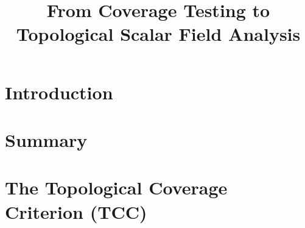 \documentclass[12pt]{article}
\begin{document}
\title{From Coverage Testing to Topological Scalar Field Analysis}
\maketitle



\section{Introduction}\label{sec:introduction}
  
  

%     
%     
%     
%     
%     


\section{Summary}\label{sec:summary}


\section{The Topological Coverage Criterion (TCC)}\label{sec:tcc}

\end{document}
